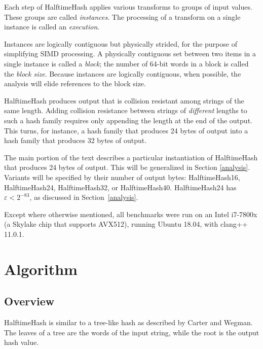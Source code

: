 \documentclass[runningheads]{llncs}
\begin{document}
Each step of HalftimeHash applies various transforms to groups of input values.
These groups are called {\em instances}.
The processing of a transform on a single instance is called an {\em execution}.

Instances are logically contiguous but physically strided, for the purpose of simplifying SIMD processing.
A physically contiguous set between two items in a single instance is called a {\em block}; the number of 64-bit words in a block is called the {\em block size}.
Because instances are logically contiguous, when possible, the analysis will elide references to the block size.

HalftimeHash produces output that is collision resistant among strings of the same length.
Adding collision resistance between strings of {\em different} lengths to such a hash family requires only appending the length at the end of the output.
This turns, for instance, a hash family that produces 24 bytes of output into a hash family that produces 32 bytes of output.

The main portion of the text describes a particular instantiation of HalftimeHash that produces 24 bytes of output.
This will be generalized in Section \ref{analysis}.
Variants will be specified by their number of output bytes: HalftimeHash16, HalftimeHash24, HalftimeHash32, or HalftimeHash40.
HalftimeHash24 has $\varepsilon < 2^{-83}$, as discussed in Section~\ref{analysis}.

Except where otherwise mentioned, all benchmarks were run on an Intel i7-7800x (a Skylake chip that supports AVX512), running Ubuntu 18.04, with clang++ 11.0.1.



\section{Algorithm}
\label{algo}

\subsection{Overview}

HalftimeHash is similar to a tree-like hash as described by Carter and Wegman. \cite[Section 3]{carter-wegman-79}
The leaves of a tree are the words of the input string, while the root is the output hash value.
\end{document}
